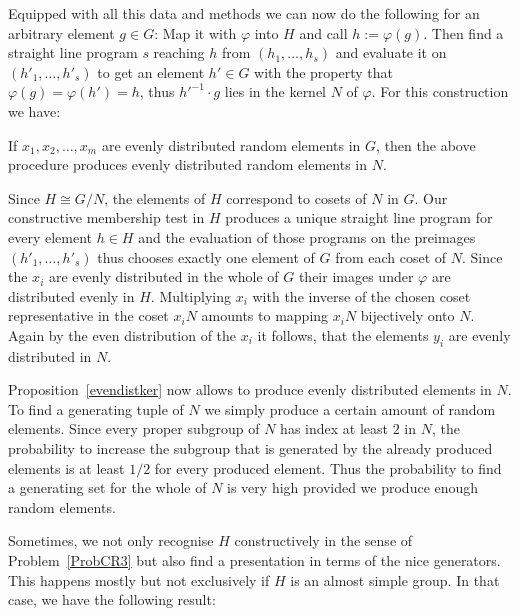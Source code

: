Equipped with all this data and methods we can now do the following
for an arbitrary element $g \in G$: Map it with $\varphi$ into $H$
and call $h := \varphi(g)$. Then find a straight line program $s$ reaching
$h$ from $(h_1, \ldots, h_s)$ and evaluate it on $(h'_1, \ldots, h'_s)$
to get an element $h' \in G$ with the property that
$\varphi(g)=\varphi(h') = h$, thus $h'^{-1}\cdot g$ lies in the kernel $N$
of $\varphi$. For this construction we have:

\begin{Prop}
\label{evendistker}
If $x_1, x_2, \ldots, x_m$ are evenly distributed random elements in $G$,
then the above procedure produces evenly distributed random elements in
$N$.
\end{Prop}
\proofbeg
Since $H \cong G/N$, the elements of $H$ correspond to cosets of $N$ in
$G$. Our constructive membership test in $H$ produces a unique straight
line program for every element $h \in H$ and the evaluation of those
programs on the preimages $(h'_1, \ldots, h'_s)$ thus chooses exactly one
element of $G$ from each coset of $N$. Since the $x_i$ are evenly
distributed in the whole of $G$ their images under $\varphi$ are
distributed evenly in $H$. Multiplying $x_i$ with the inverse of the
chosen coset representative in the coset $x_iN$ amounts to mapping
$x_i N$ bijectively onto $N$. Again by the even distribution of the $x_i$
it follows, that the elements $y_i$ are evenly distributed in $N$.
\proofend

\smallskip
Proposition~\ref{evendistker} now allows to produce evenly distributed
elements in $N$. To find a generating tuple of $N$ we simply produce
a certain amount of random elements. Since every proper subgroup of $N$ 
has index at least $2$ in $N$, the probability to increase the
subgroup that is generated by the already produced elements is at least 
$1/2$ for every produced element. Thus the probability to find a generating
set for the whole of $N$ is very high provided we produce enough random
elements.

\medskip
Sometimes, we not only recognise $H$ constructively in the sense of
Problem~\ref{ProbCR3} but also find a presentation in terms of the 
nice generators. This happens mostly but not exclusively if $H$ is an 
almost simple group. In that case, we have the following result:

